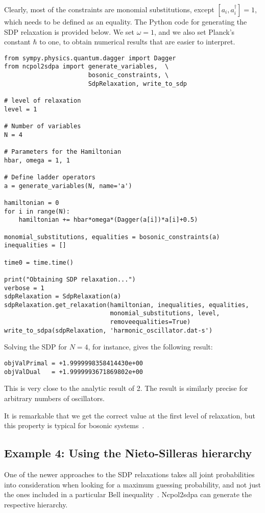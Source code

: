 \documentclass{article}
\begin{document}
Clearly, most of the constraints are monomial substitutions, except $[a_{i},a_{i}^{\dagger}]=1$, which needs to be defined as an equality. The Python code for generating the SDP relaxation is provided below. We set $\omega=1$, and we also set Planck's constant $\hbar$ to one, to obtain numerical results that are easier to interpret.
\begin{verbatim}
from sympy.physics.quantum.dagger import Dagger
from ncpol2sdpa import generate_variables,  \
                       bosonic_constraints, \
                       SdpRelaxation, write_to_sdp

# level of relaxation
level = 1

# Number of variables
N = 4

# Parameters for the Hamiltonian
hbar, omega = 1, 1

# Define ladder operators
a = generate_variables(N, name='a')

hamiltonian = 0
for i in range(N):
    hamiltonian += hbar*omega*(Dagger(a[i])*a[i]+0.5)

monomial_substitutions, equalities = bosonic_constraints(a)
inequalities = []

time0 = time.time()

print("Obtaining SDP relaxation...")
verbose = 1
sdpRelaxation = SdpRelaxation(a)
sdpRelaxation.get_relaxation(hamiltonian, inequalities, equalities,
                             monomial_substitutions, level,
                             removeequalities=True)
write_to_sdpa(sdpRelaxation, 'harmonic_oscillator.dat-s')                      
\end{verbatim}

Solving the SDP for $N=4$, for instance, gives the following result:
\begin{verbatim}
objValPrimal = +1.9999998358414430e+00
objValDual   = +1.9999993671869802e+00
\end{verbatim}
This is very close to the analytic result of 2. The result is similarly precise for arbitrary numbers of oscillators. 

It is remarkable that we get the correct value at the first level of relaxation, but this property is typical for bosonic systems~\citep{navascues2013paradox}.

\subsection{Example 4: Using the Nieto-Silleras hierarchy}
One of the newer approaches to the SDP relaxations takes all joint probabilities into consideration when looking for a maximum guessing probability, and not just the ones included in a particular Bell inequality~\citep{nieto-silleras2014using,bancal2014more}. Ncpol2sdpa can generate the respective hierarchy.
\end{document}
